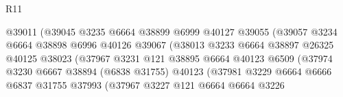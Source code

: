 \begin{lexlean}{R11}
\begin{coremodule}
                                        @39011
                                        (@39045
                                          @3235
                                          @6664
                                          @38899
                                          @6999
                                          @40127
                                          @39055
                                          (@39057
                                            @3234
                                            @6664
                                            @38898
                                            @6996
                                            @40126
                                            @39067
                                            (@38013
                                              @3233
                                              @6664
                                              @38897
                                              @26325
                                              @40125
                                              @38023
                                              (@37967
                                                @3231
                                                @121
                                                @38895
                                                @6664
                                                @40123
                                                @6509
                                                (@37974
                                                  @3230
                                                  @6667
                                                  @38894
                                                  (@6838 @31755)
                                                  @40123
                                                  (@37981
                                                    @3229
                                                    @6664
                                                    @6666
                                                    @6837
                                                    @31755
                                                    @37993
                                                    (@37967
                                                      @3227
                                                      @121
                                                      @6664
                                                      @6664
                                                      @3226

\end{coremodule}
\end{lexlean}
